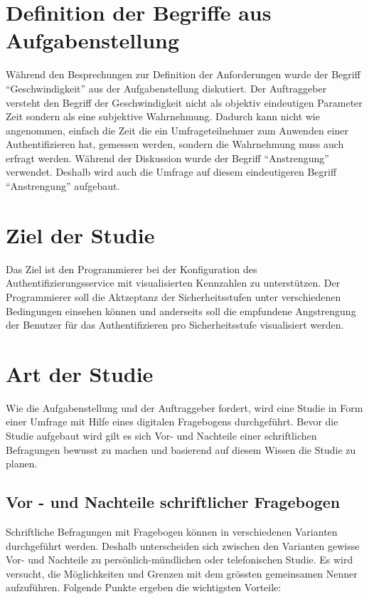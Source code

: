 \section{Definition der Begriffe aus
Aufgabenstellung}\label{definition-der-begriffe-aus-aufgabenstellung}

Während den Besprechungen zur Definition der Anforderungen wurde der
Begriff ``Geschwindigkeit'' aus der Aufgabenstellung diskutiert. Der
Auftraggeber versteht den Begriff der Geschwindigkeit nicht als objektiv
eindeutigen Parameter Zeit sondern als eine subjektive Wahrnehmung.
Dadurch kann nicht wie angenommen, einfach die Zeit die ein
Umfrageteilnehmer zum Anwenden einer Authentifizieren hat, gemessen
werden, sondern die Wahrnehmung muss auch erfragt werden. Während der
Diskussion wurde der Begriff ``Anstrengung'' verwendet. Deshalb wird
auch die Umfrage auf diesem eindeutigeren Begriff ``Anstrengung''
aufgebaut.

\section{Ziel der Studie}\label{ziel-der-studie}

Das Ziel ist den Programmierer bei der Konfiguration des
Authentifizierungsservice mit visualisierten Kennzahlen zu unterstützen.
Der Programmierer soll die Aktzeptanz der Sicherheitsstufen unter
verschiedenen Bedingungen einsehen können und anderseits soll die
empfundene Angstrengung der Benutzer für das Authentifizieren pro
Sicherheitsstufe visualisiert werden.

\section{Art der Studie}\label{art-der-studie}

Wie die Aufgabenstellung und der Auftraggeber fordert, wird eine Studie
in Form einer Umfrage mit Hilfe eines digitalen Fragebogens
durchgeführt. Bevor die Studie aufgebaut wird gilt es sich Vor- und
Nachteile einer schriftlichen Befragungen bewusst zu machen und
basierend auf diesem Wissen die Studie zu planen.

\newpage

\subsection{Vor - und Nachteile schriftlicher
Fragebogen}\label{vor---und-nachteile-schriftlicher-fragebogen}

Schriftliche Befragungen mit Fragebogen können in verschiedenen
Varianten durchgeführt werden. Deshalb unterscheiden sich zwischen den
Varianten gewisse Vor- und Nachteile zu persönlich-mündlichen oder
telefonischen Studie. Es wird versucht, die Möglichkeiten und Grenzen
mit dem grössten gemeinsamen Nenner aufzuführen. Folgende Punkte ergeben
die wichtigsten Vorteile:

